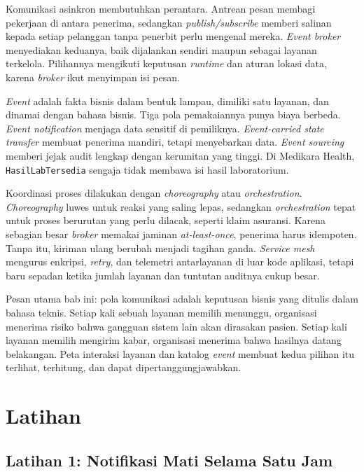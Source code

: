 Komunikasi asinkron membutuhkan perantara. Antrean pesan membagi pekerjaan di antara penerima,
sedangkan \textit{publish/subscribe} memberi salinan kepada setiap pelanggan tanpa penerbit perlu
mengenal mereka. \textit{Event broker} menyediakan keduanya, baik dijalankan sendiri maupun sebagai
layanan terkelola. Pilihannya mengikuti keputusan \textit{runtime} dan aturan lokasi data, karena
\textit{broker} ikut menyimpan isi pesan.

\textit{Event} adalah fakta bisnis dalam bentuk lampau, dimiliki satu layanan, dan dinamai dengan
bahasa bisnis. Tiga pola pemakaiannya punya biaya berbeda. \textit{Event notification} menjaga data
sensitif di pemiliknya. \textit{Event-carried state transfer} membuat penerima mandiri, tetapi
menyebarkan data. \textit{Event sourcing} memberi jejak audit lengkap dengan kerumitan yang tinggi.
Di Medikara Health, \texttt{HasilLabTersedia} sengaja tidak membawa isi hasil laboratorium.

Koordinasi proses dilakukan dengan \textit{choreography} atau \textit{orchestration}.
\textit{Choreography} luwes untuk reaksi yang saling lepas, sedangkan \textit{orchestration} tepat
untuk proses berurutan yang perlu dilacak, seperti klaim asuransi. Karena sebagian besar
\textit{broker} memakai jaminan \textit{at-least-once}, penerima harus idempoten. Tanpa itu,
kiriman ulang berubah menjadi tagihan ganda. \textit{Service mesh} mengurus enkripsi,
\textit{retry}, dan telemetri antarlayanan di luar kode aplikasi, tetapi baru sepadan ketika
jumlah layanan dan tuntutan auditnya cukup besar.

Pesan utama bab ini: pola komunikasi adalah keputusan bisnis yang ditulis dalam bahasa teknis.
Setiap kali sebuah layanan memilih menunggu, organisasi menerima risiko bahwa gangguan sistem lain
akan dirasakan pasien. Setiap kali layanan memilih mengirim kabar, organisasi menerima bahwa hasilnya
datang belakangan. Peta interaksi layanan dan katalog \textit{event} membuat kedua pilihan itu
terlihat, terhitung, dan dapat dipertanggungjawabkan.

\section{Latihan}

\subsection*{Latihan 1: Notifikasi Mati Selama Satu Jam}

